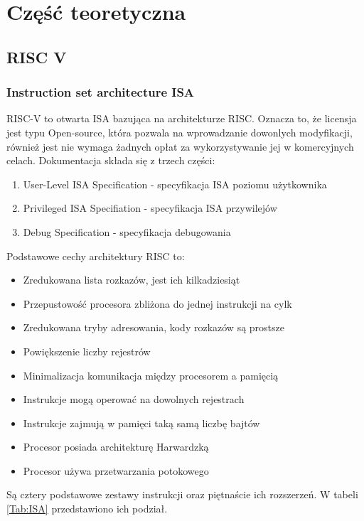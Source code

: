\documentclass[11pt,a4paper]{article}
\begin{document}
\section{Część teoretyczna}

	\subsection{RISC V}

		\subsubsection{Instruction set architecture ISA}
		\hspace{5mm}
		RISC-V to otwarta ISA bazująca na architekturze RISC. Oznacza to, że licensja jest typu Open-source, która pozwala na wprowadzanie dowonlych modyfikacji\cite{open_source}, również jest nie wymaga żadnych opłat za wykorzystywanie jej w komercyjnych celach. Dokumentacja składa się z trzech części\cite{isa_site}:
		\begin{enumerate}
			\item User-Level ISA Specification - specyfikacja ISA poziomu użytkownika
			\item Privileged ISA Specifiation - specyfikacja ISA przywilejów
			\item Debug Specification - specyfikacja debugowania 
		\end{enumerate}
		Podstawowe cechy architektury RISC to:
		\begin{itemize}
		\item Zredukowana lista rozkazów, jest ich kilkadziesiąt
		\item Przepustowość procesora zbliżona do jednej instrukcji na cylk
		\item Zredukowana tryby adresowania, kody rozkazów są prostsze
		\item Powiększenie liczby rejestrów
		\item Minimalizacja komunikacja między procesorem a pamięcią
		\item Instrukcje mogą operować na dowolnych rejestrach
		\item Instrukcje zajmują w pamięci taką samą liczbę bajtów
		\item Procesor posiada architekturę Harwardzką
		\item Procesor używa przetwarzania potokowego
		\end{itemize}
		Są cztery podstawowe zestawy instrukcji oraz piętnaście ich rozszerzeń. W tabeli \ref{Tab:ISA} przedstawiono ich podział.
\end{document}

